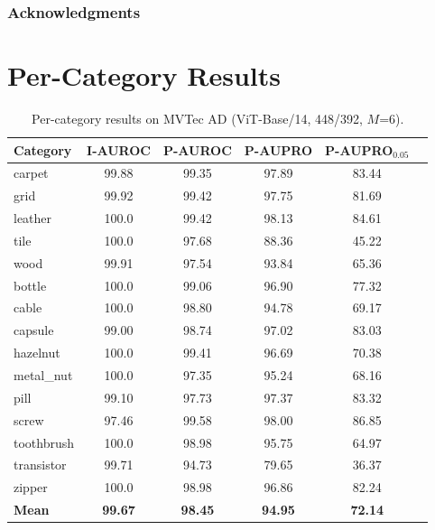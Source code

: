 \documentclass[10pt]{article} %
\begin{document}
\subsubsection*{Acknowledgments}





\appendix
\section{Per-Category Results}
\label{app:per_category}

\begin{table}[H]
\caption{Per-category results on MVTec AD (ViT-Base/14, 448/392, $M$=6).}
\label{tab:mvtec_per_cat}
\begin{center}
\small
\begin{tabular}{lccccc}
\toprule
Category & I-AUROC & P-AUROC & P-AUPRO & P-AUPRO$_{0.05}$ \\
\midrule
carpet     & 99.88 & 99.35 & 97.89 & 83.44 \\
grid       & 99.92 & 99.42 & 97.75 & 81.69 \\
leather    & 100.0 & 99.42 & 98.13 & 84.61 \\
tile       & 100.0 & 97.68 & 88.36 & 45.22 \\
wood       & 99.91 & 97.54 & 93.84 & 65.36 \\
bottle     & 100.0 & 99.06 & 96.90 & 77.32 \\
cable      & 100.0 & 98.80 & 94.78 & 69.17 \\
capsule    & 99.00 & 98.74 & 97.02 & 83.03 \\
hazelnut   & 100.0 & 99.41 & 96.69 & 70.38 \\
metal\_nut & 100.0 & 97.35 & 95.24 & 68.16 \\
pill       & 99.10 & 97.73 & 97.37 & 83.32 \\
screw      & 97.46 & 99.58 & 98.00 & 86.85 \\
toothbrush & 100.0 & 98.98 & 95.75 & 64.97 \\
transistor & 99.71 & 94.73 & 79.65 & 36.37 \\
zipper     & 100.0 & 98.98 & 96.86 & 82.24 \\
\midrule
\textbf{Mean} & \textbf{99.67} & \textbf{98.45} & \textbf{94.95} & \textbf{72.14} \\
\bottomrule
\end{tabular}
\end{center}
\end{table}
\end{document}
